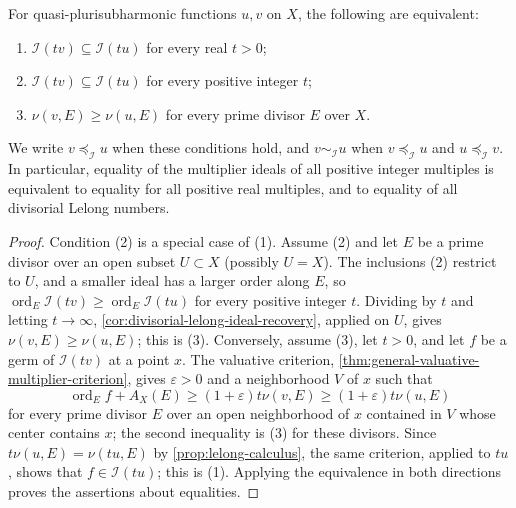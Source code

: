 \begin{proposition}\label{prop:multiplier-singularity-order}
For quasi-plurisubharmonic functions $u,v$ on $X$, the following are equivalent:
\begin{enumerate}
 \item $\mathcal I(tv)\subseteq\mathcal I(tu)$ for every real $t>0$;
 \item $\mathcal I(tv)\subseteq\mathcal I(tu)$ for every positive integer $t$;
 \item $\nu(v,E)\geq\nu(u,E)$ for every prime divisor $E$ over $X$.
\end{enumerate}
We write $v\preceq_{\mathcal I}u$ when these conditions hold, and $v\sim_{\mathcal I}u$ when $v\preceq_{\mathcal I}u$ and $u\preceq_{\mathcal I}v$. In particular, equality of the multiplier ideals of all positive integer multiples is equivalent to equality for all positive real multiples, and to equality of all divisorial Lelong numbers.
\end{proposition}
\begin{proof}
Condition (2) is a special case of (1). Assume (2) and let $E$ be a prime divisor over an open subset $U\subset X$ (possibly $U=X$). The inclusions (2) restrict to $U$, and a smaller ideal has a larger order along $E$, so $\operatorname{ord}_E\mathcal I(tv)\geq\operatorname{ord}_E\mathcal I(tu)$ for every positive integer $t$. Dividing by $t$ and letting $t\to\infty$, \cref{cor:divisorial-lelong-ideal-recovery}, applied on $U$, gives $\nu(v,E)\geq\nu(u,E)$; this is (3). Conversely, assume (3), let $t>0$, and let $f$ be a germ of $\mathcal I(tv)$ at a point $x$. The valuative criterion, \cref{thm:general-valuative-multiplier-criterion}, gives $\varepsilon>0$ and a neighborhood $V$ of $x$ such that
\[
 \operatorname{ord}_E f+A_X(E)
       \geq(1+\varepsilon)t\nu(v,E)
       \geq(1+\varepsilon)t\nu(u,E)
\]
for every prime divisor $E$ over an open neighborhood of $x$ contained in $V$ whose center contains $x$; the second inequality is (3) for these divisors. Since $t\nu(u,E)=\nu(tu,E)$ by \cref{prop:lelong-calculus}, the same criterion, applied to $tu$, shows that $f\in\mathcal I(tu)$; this is (1). Applying the equivalence in both directions proves the assertions about equalities.
\end{proof}

